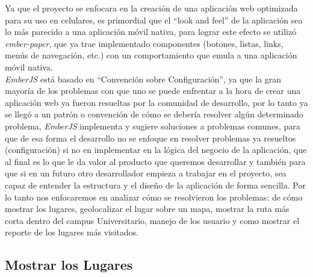 Ya que el proyecto se enfocara en la creación de una aplicación web optimizada para su uso en celulares, es primordial que el ``look and feel'' de la aplicación sea lo más parecido a una aplicación móvil nativa, para lograr este efecto se utilizó \emph{ember-paper}, que ya trae implementado componentes (botones, listas, links, menús de navegación, etc.) con un comportamiento que emula a una aplicación móvil nativa.\\


\emph{EmberJS} está basado en ``Convención sobre Configuración'', ya que la gran mayoría de los problemas con que uno se puede enfrentar a la hora de crear una aplicación web ya fueron resueltas por la comunidad de desarrollo, por lo tanto ya se llegó a un patrón o convención de cómo se debería resolver algún determinado problema, \emph{EmberJS} implementa y sugiere soluciones a problemas comunes, para que de esa forma el desarrollo no se enfoque  en resolver problemas ya resueltos (configuración) si no en implementar en la lógica del negocio de la aplicación, que al final es lo que le da valor al producto que queremos desarrollar y también para que si en un futuro otro desarrollador empieza a trabajar en el proyecto, sea capaz de entender la estructura y el diseño de la aplicación de forma sencilla. Por lo tanto nos enfocaremos en analizar cómo se resolvieron los problemas: de cómo mostrar los lugares, geolocalizar el lugar sobre un mapa, mostrar la ruta más corta dentro del campus Universitario, manejo de los usuario y como mostrar el reporte de los lugares más visitados.

\subsection{Mostrar los Lugares}
\label{sub:Mostrar los Lugares}




%
%
%


